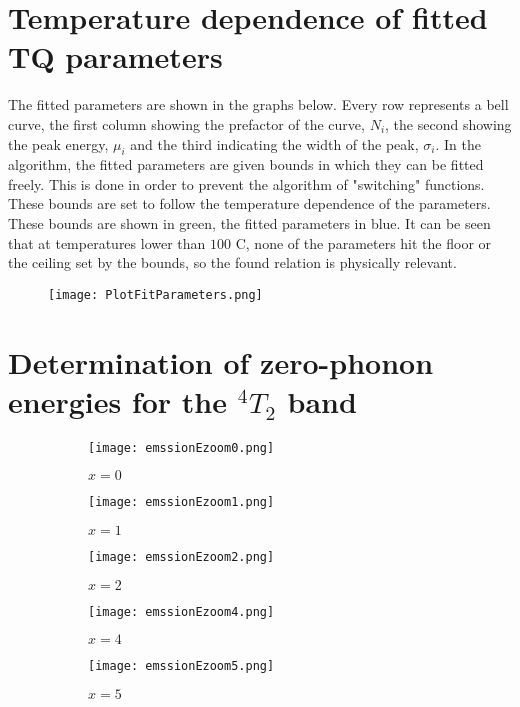 \chapter{Temperature dependence of fitted TQ parameters\label{app1}}
The fitted parameters are shown in the graphs below. Every row represents a bell curve, the first column showing the prefactor of the curve, $N_i$, the second showing the peak energy, $\mu_i$ and the third indicating the width of the peak, $\sigma_i$. In the algorithm, the fitted parameters are given bounds in which they can be fitted freely. This is done in order to prevent the algorithm of "switching" functions. These bounds are set to follow the temperature dependence of the parameters. These bounds are shown in green, the fitted parameters in blue. It can be seen that at temperatures lower than $100$ \degree{}C, none of the parameters hit the floor or the ceiling set by the bounds, so the found relation is physically relevant.
\begin{figure}
    \centering
    \texttt{[image: PlotFitParameters.png]}
\end{figure}

\chapter{Determination of zero-phonon energies for the ${}^4T_2$ band\label{app2}}
\begin{figure}
\centering
\begin{subfigure}{0.7\textwidth{}}
    \centering
    \texttt{[image: emssionEzoom0.png]}
    \caption{$x=0$}
\end{subfigure}
\begin{subfigure}{0.7\textwidth{}}
    \centering
    \texttt{[image: emssionEzoom1.png]}
    \caption{$x=1$}
\end{subfigure}
\caption{}
\end{figure}

\begin{figure}
\centering
\begin{subfigure}{0.7\textwidth{}}
    \centering
    \texttt{[image: emssionEzoom2.png]}
    \caption{$x=2$}
\end{subfigure}
\begin{subfigure}{0.7\textwidth{}}
    \centering
    \texttt{[image: emssionEzoom4.png]}
    \caption{$x=4$}
\end{subfigure}
\begin{subfigure}{0.7\textwidth{}}
\centering
\texttt{[image: emssionEzoom5.png]}
\caption{$x=5$}
\end{subfigure}
\caption{}
\end{figure}
